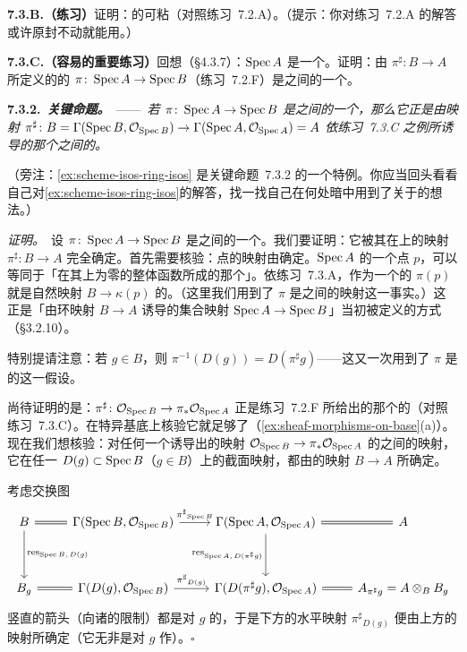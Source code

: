 \textbf{7.3.B.（练习）}\quad 证明：\trLocallyRingedSpace{}的\trMorphism{}可粘（对照练习~7.2.A）。（提示：你对练习~7.2.A 的解答或许原封不动就能用。）

\textbf{7.3.C.（容易的重要练习）}\quad 回想（\S4.3.7）：$\operatorname{Spec} A$ 是一个\trLocallyRingedSpace。证明：由\trRingMorphism{} $\pi^{\sharp}\colon B\to A$ 所定义的\trRingedSpace{}的\trMorphism{} $\pi\colon\operatorname{Spec} A\to\operatorname{Spec} B$（练习~7.2.F）是\trLocallyRingedSpace{}之间的一个\trMorphism。

\textbf{7.3.2.}\ \emph{\textbf{关键命题。}}\ ——\ \emph{若 $\pi\colon\operatorname{Spec} A\to\operatorname{Spec} B$ 是\trLocallyRingedSpace{}之间的一个\trMorphism，那么它正是由映射 $\pi^{\sharp}\colon B=\Gamma(\operatorname{Spec} B,\mathcal{O}_{\operatorname{Spec} B})\to\Gamma(\operatorname{Spec} A,\mathcal{O}_{\operatorname{Spec} A})=A$ 依练习~7.3.C 之例所诱导的那个\trLocallyRingedSpace{}之间的\trMorphism。}

（旁注：\cref{ex:scheme-isos-ring-isos} 是关键命题~7.3.2 的一个特例。你应当回头看看自己对\cref{ex:scheme-isos-ring-isos}的解答，找一找自己在何处暗中用到了关于\trLocallyRingedSpace{}的想法。）

\emph{证明。}\ 设 $\pi\colon\operatorname{Spec} A\to\operatorname{Spec} B$ 是\trLocallyRingedSpace{}之间的一个\trMorphism。我们要证明：它被其在\trGlobalSections{}上的映射 $\pi^{\sharp}\colon B\to A$ 完全确定。首先需要核验：点的映射由\trGlobalSections{}确定。$\operatorname{Spec} A$ 的一个点 $p$，可以等同于「在其上为零的整体函数所成的那个\trPrimeIdeal」。依练习~7.3.A，作为一个\trIdeal{}的 $\pi(p)$ 就是自然映射 $B\to\kappa(p)$ 的\trKernel。（这里我们用到了 $\pi$ 是\trLocallyRingedSpace{}之间的映射这一事实。）这正是「由环映射 $B\to A$ 诱导的集合映射 $\operatorname{Spec} A\to\operatorname{Spec} B$」当初被定义的方式（\S3.2.10）。

特别提请注意：若 $g\in B$，则 $\pi^{-1}(D(g))=D(\pi^{\sharp}g)$——这又一次用到了 $\pi$ 是\trLocallyRingedSpace{}的\trMorphism{}这一假设。

尚待证明的是：$\pi^{\sharp}\colon\mathcal{O}_{\operatorname{Spec} B}\to\pi_*\mathcal{O}_{\operatorname{Spec} A}$ 正是练习~7.2.F 所给出的那个\trSheaf{}的\trMorphism（对照练习~7.3.C）。在特异基底上核验它就足够了（\cref{ex:sheaf-morphisms-on-base}(a)）。现在我们想核验：对任何一个诱导出\trSheaf{}的映射 $\mathcal{O}_{\operatorname{Spec} B}\to\pi_*\mathcal{O}_{\operatorname{Spec} A}$ 的\trLocallyRingedSpace{}之间的映射，它在任一\trDistinguishedOpen{} $D(g)\subset\operatorname{Spec} B$（$g\in B$）上的截面映射，都由\trGlobalSections{}的映射 $B\to A$ 所确定。

考虑交换图
\[
\begin{tikzcd}[row sep=3.4em]
B \ar[r, equal] \ar[d, "\mathrm{res}_{\Spec B,\,D(g)}"] &
\Gamma(\Spec B,\OO_{\Spec B}) \ar[r, "\pi^{\sharp}{}_{\Spec B}"] &
\Gamma(\Spec A,\OO_{\Spec A}) \ar[r, equal] \ar[d, "\mathrm{res}_{\Spec A,\,D(\pi^{\sharp}g)}"'] &
A \\
B_g \ar[r, equal] &
\Gamma(D(g),\OO_{\Spec B}) \ar[r, "\pi^{\sharp}{}_{D(g)}"] &
\Gamma(D(\pi^{\sharp}g),\OO_{\Spec A}) \ar[r, equal] &
A_{\pi^{\sharp}g}=A\otimes_B B_g
\end{tikzcd}
\]
竖直的箭头（向诸\trDistinguishedOpen{}的限制）都是对 $g$ 的\trLocalization，于是下方的水平映射 $\pi^{\sharp}{}_{D(g)}$ 便由上方的映射所确定（它无非是对 $g$ 作\trLocalization）。\hfill$\square$

